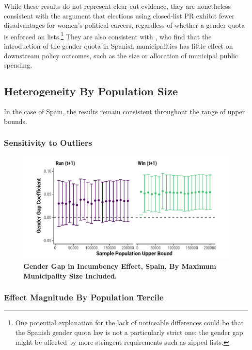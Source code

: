 \documentclass[12pt]{article}
\begin{document}
While these results do not represent clear-cut evidence, they are nonetheless consistent with the argument that elections using closed-list PR exhibit fewer disadvantages for women's political careers, regardless of whether a gender quota is enforced on lists.\footnote{One potential explanation for the lack of noticeable differences could be that the Spanish gender quota law is not a particularly strict one: the gender gap might be affected by more stringent requirements such as zipped lists.} They are also consistent with \citet{bagues2020}, who find that the introduction of the gender quota in Spanish municipalities has little effect on downstream policy outcomes, such as the size or allocation of municipal public spending.

\clearpage
\subsection{Heterogeneity By Population Size}
\label{app:hetero_spain}

In the case of Spain, the results remain consistent throughout the range of upper bounds.

\subsubsection{Sensitivity to Outliers}

\begin{figure}[!htb]
    \centering
    \includegraphics[width = 0.8 \textwidth]{../output/figures/spain_muni_robust.pdf}
    \caption{\textbf{Gender Gap in Incumbency Effect, Spain, By Maximum Municipality Size Included.}}
    \label{fig:spain_outliers}
\end{figure}


\subsubsection{Effect Magnitude By Population Tercile}
\end{document}
